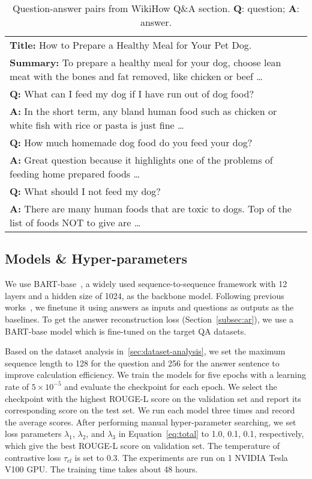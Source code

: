 \documentclass[11pt]{article}
\begin{document}
\begin{table}[htbp!]
\centering\small
\begin{tabular}{p{}}
\hline
\textbf{Title:} How to Prepare a Healthy Meal for Your Pet Dog. \\
\textbf{Summary:} To prepare a healthy meal for your dog, choose lean meat with the bones and fat removed, like chicken or beef \dots \\ \hline
\textbf{Q:} What can I feed my dog if I have run out of dog food? \\
\textbf{A:} In the short term, any bland human food such as chicken or white fish with rice or pasta is just fine \dots \\
\textbf{Q:} How much homemade dog food do you feed your dog? \\
\textbf{A:} Great question because it highlights one of the problems of feeding home prepared foods \dots \\
\textbf{Q:} What should I not feed my dog?  \\
\textbf{A:} There are many human foods that are toxic to dogs. Top of the list of foods NOT to give are \dots \\

\hline
\end{tabular}
\caption{Question-answer pairs from WikiHow Q\&A section. \textbf{Q}: question; \textbf{A}: answer.}
\label{tab:an-example}
\end{table}
\vspace{-0.3cm}







\subsection{Models \& Hyper-parameters}
We use BART-base~\cite{lewis-etal-2020-bart}, a widely used sequence-to-sequence framework with 12 layers and a hidden size of 1024, as the backbone model. Following previous works~\cite{fan-etal-2019-eli5,khashabi-etal-2021-gooaq-open}, we finetune it using answers as inputs and questions as outputs as the baselines. To get the answer reconstruction loss (Section~\ref{subsec:ar}), we use a BART-base model which is fine-tuned on the target QA datasets. 

Based on the dataset analysis in~\ref{sec:dataset-analysis}, we set the maximum sequence length to 128 for the question and 256 for the answer sentence to improve calculation efficiency.
We train the models for five epochs with a learning rate of $5\times 10^{-5}$ and evaluate the checkpoint for each epoch. 
We select the checkpoint with the highest ROUGE-L score on the validation set and report its corresponding score on the test set.
We run each model three times and record the average scores. 
After performing manual hyper-parameter searching, we set loss parameters $\lambda_{1}$, $\lambda_{2}$, and $\lambda_{3}$ in Equation~\ref{eq:total} to 1.0, 0.1, 0.1, respectively, which give the best ROUGE-L score on validation set. The temperature of contrastive loss $\tau_{cl}$ is set to 0.3. The experiments are run on 1 NVIDIA Tesla V100 GPU. The training time takes about 48 hours.
\end{document}
